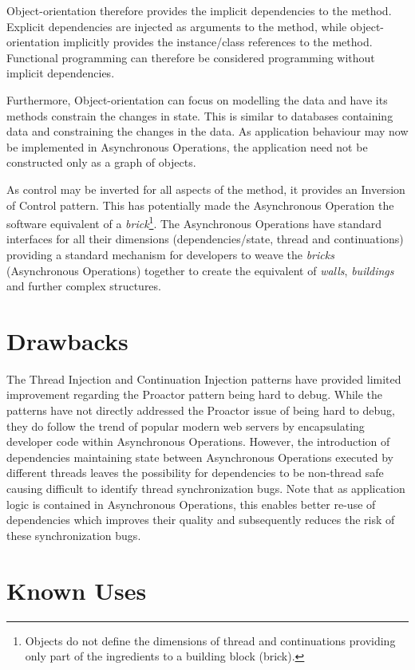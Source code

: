 \documentclass[prodmode]{style/acmlarge}
\begin{document}
Object-orientation therefore provides the implicit dependencies to the
method.  Explicit dependencies are injected as arguments to the method, while
object-orientation implicitly provides the instance/class references to the
method.  Functional programming can therefore be considered programming without
implicit dependencies.

Furthermore, Object-orientation can focus on modelling the data and have its
methods constrain the changes in state.  This is similar to databases containing
data and constraining the changes in the data.  As application behaviour may now
be implemented in Asynchronous Operations, the application need not be constructed
only as a graph of objects.

As control may be inverted for all aspects of the method, it provides an
Inversion of Control pattern.  This has potentially made the Asynchronous
Operation the software equivalent of a \textit{brick}\footnote{Objects do not
define the dimensions of thread and continuations providing only part of the
ingredients to a building block (brick).}.  The Asynchronous Operations have
standard interfaces for all their dimensions (dependencies/state, thread and
continuations) providing a standard mechanism for developers to weave the
\textit{bricks} (Asynchronous Operations) together to create the equivalent of
\textit{walls}, \textit{buildings} and further complex structures.


\section{Drawbacks}

The Thread Injection and Continuation Injection patterns have provided limited
improvement regarding the Proactor pattern being hard to debug.  While the
patterns have not directly addressed the Proactor issue of being hard to debug,
they do follow the trend of popular modern web servers by encapsulating
developer code within Asynchronous Operations.  However, the introduction of
dependencies maintaining state between Asynchronous Operations executed by
different threads leaves the possibility for dependencies to be non-thread safe
causing difficult to identify thread synchronization bugs.  Note that as
application logic is contained in Asynchronous Operations, this enables better
re-use of dependencies which improves their quality and subsequently reduces the
risk of these synchronization bugs.


\section{Known Uses}
\end{document}
